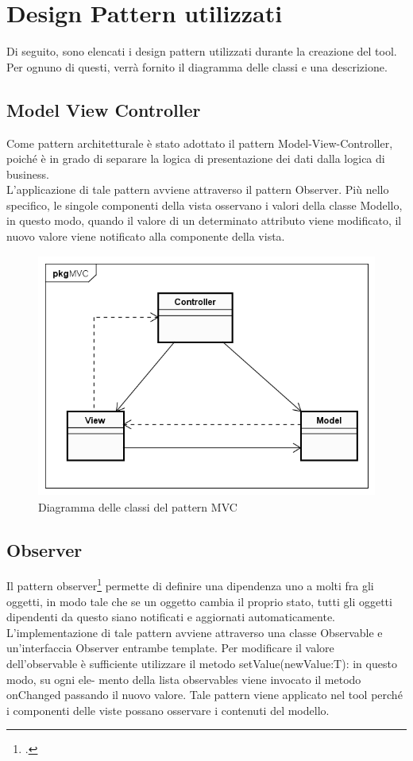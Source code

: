 
\section{Design Pattern utilizzati}\label{sec:design-pattern-utilizzati}
Di seguito, sono elencati i design pattern utilizzati durante la creazione del tool. Per ognuno di questi, verrà fornito il diagramma delle classi e una descrizione.
\subsection{Model View Controller}\label{subsec:model-view-controller}
Come pattern architetturale è stato adottato il pattern Model-View-Controller, poiché è in grado di separare la logica di presentazione dei dati dalla logica di business.\\
L’applicazione di tale pattern avviene attraverso il pattern Observer.
Più nello specifico, le singole componenti della vista osservano i valori della classe Modello, in questo modo, quando il valore di un determinato attributo viene modificato, il nuovo valore viene notificato alla componente della vista.

\begin{figure}[H]
    \centering
    \includegraphics[width=13cm, height=8cm]{./immagini/diagrammi_uml/mvc.png}
    \caption{Diagramma delle classi del pattern MVC}\label{fig:mvc}
\end{figure}

\newpage
\subsection{Observer}\label{subsec:observer}
Il pattern observer\footcite{womak:observer} permette di definire una dipendenza uno a molti fra gli
oggetti, in modo tale che se un oggetto cambia il proprio stato, tutti gli oggetti
dipendenti da questo siano notificati e aggiornati automaticamente.
L’implementazione di tale pattern avviene attraverso una classe Observable e un’interfaccia Observer entrambe template.
Per modificare il valore dell’observable è sufficiente utilizzare il metodo setValue(newValue:T): in questo modo, su ogni ele-
mento della lista observables viene invocato il metodo onChanged passando il nuovo valore.
Tale pattern viene applicato nel tool perché i componenti delle viste possano osservare i contenuti del modello.

